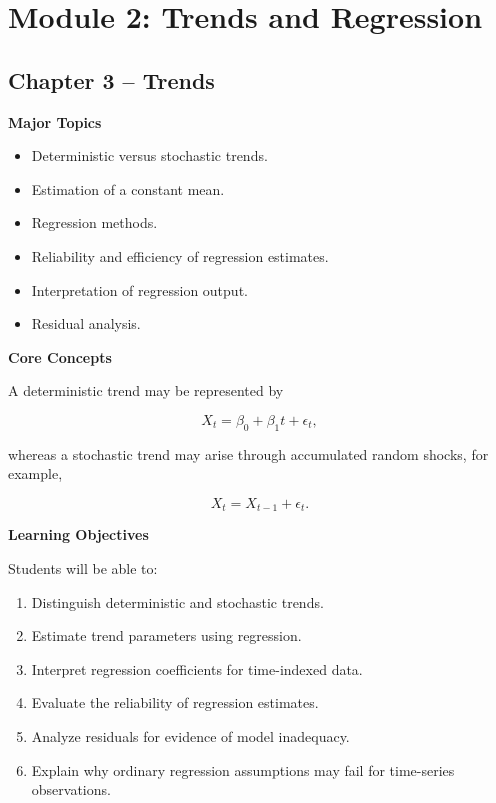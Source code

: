 \documentclass[11pt,a4paper]{article}
\begin{document}
\section{Module 2: Trends and Regression}

\subsection{Chapter 3 -- Trends}

\textbf{Major Topics}

\begin{itemize}
    \item Deterministic versus stochastic trends.
    \item Estimation of a constant mean.
    \item Regression methods.
    \item Reliability and efficiency of regression estimates.
    \item Interpretation of regression output.
    \item Residual analysis.
\end{itemize}

\textbf{Core Concepts}

A deterministic trend may be represented by

\[
X_t = \beta_0+\beta_1t+\epsilon_t,
\]

whereas a stochastic trend may arise through accumulated random shocks,
for example,

\[
X_t=X_{t-1}+\epsilon_t.
\]

\textbf{Learning Objectives}

Students will be able to:

\begin{enumerate}
    \item Distinguish deterministic and stochastic trends.
    \item Estimate trend parameters using regression.
    \item Interpret regression coefficients for time-indexed data.
    \item Evaluate the reliability of regression estimates.
    \item Analyze residuals for evidence of model inadequacy.
    \item Explain why ordinary regression assumptions may fail for time-series
          observations.
\end{enumerate}
\end{document}
